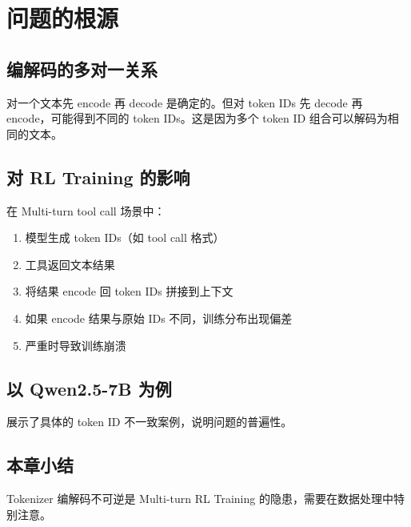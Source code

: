 \section{问题的根源}
\subsection{编解码的多对一关系}
对一个文本先 encode 再 decode 是确定的。但对 token IDs 先 decode 再 encode，可能得到不同的 token IDs。这是因为多个 token ID 组合可以解码为相同的文本。

\subsection{对 RL Training 的影响}
在 Multi-turn tool call 场景中：
\begin{enumerate}
  \item 模型生成 token IDs（如 tool call 格式）
  \item 工具返回文本结果
  \item 将结果 encode 回 token IDs 拼接到上下文
  \item 如果 encode 结果与原始 IDs 不同，训练分布出现偏差
  \item 严重时导致训练崩溃
\end{enumerate}

\subsection{以 Qwen2.5-7B 为例}
展示了具体的 token ID 不一致案例，说明问题的普遍性。

\subsection{本章小结}
Tokenizer 编解码不可逆是 Multi-turn RL Training 的隐患，需要在数据处理中特别注意。

\newpage
